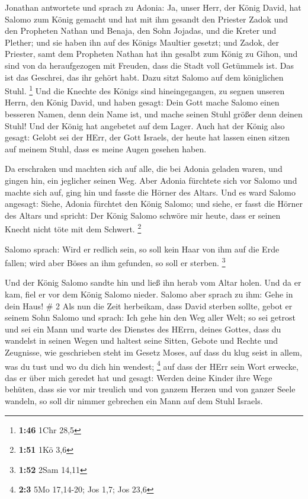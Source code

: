  Jonathan antwortete und sprach zu Adonia: Ja, unser Herr,
der König David, hat Salomo zum König gemacht  und hat mit
ihm gesandt den Priester Zadok und den Propheten Nathan und Benaja, den
Sohn Jojadas, und die Kreter und Plether; und sie haben ihn auf des
Königs Maultier gesetzt;  und Zadok, der Priester, samt dem
Propheten Nathan hat ihn gesalbt zum König zu Gihon, und sind von da
heraufgezogen mit Freuden, dass die Stadt voll Getümmels ist. Das ist
das Geschrei, das ihr gehört habt.  Dazu sitzt Salomo auf
dem königlichen Stuhl. \footnote{\textbf{1:46} 1Chr 28,5} 
Und die Knechte des Königs sind hineingegangen, zu segnen unseren Herrn,
den König David, und haben gesagt: Dein Gott mache Salomo einen besseren
Namen, denn dein Name ist, und mache seinen Stuhl größer denn deinen
Stuhl! Und der König hat angebetet auf dem Lager.  Auch hat
der König also gesagt: Gelobt sei der HErr, der Gott Israels, der heute
hat lassen einen sitzen auf meinem Stuhl, dass es meine Augen gesehen
haben.

 Da erschraken und machten sich auf alle, die bei Adonia
geladen waren, und gingen hin, ein jeglicher seinen Weg. 
Aber Adonia fürchtete sich vor Salomo und machte sich auf, ging hin und
fasste die Hörner des Altars.  Und es ward Salomo angesagt:
Siehe, Adonia fürchtet den König Salomo; und siehe, er fasst die Hörner
des Altars und spricht: Der König Salomo schwöre mir heute, dass er
seinen Knecht nicht töte mit dem Schwert. \footnote{\textbf{1:51} 1Kö
  3,6}

 Salomo sprach: Wird er redlich sein, so soll kein Haar von
ihm auf die Erde fallen; wird aber Böses an ihm gefunden, so soll er
sterben. \footnote{\textbf{1:52} 2Sam 14,11}

 Und der König Salomo sandte hin und ließ ihn herab vom
Altar holen. Und da er kam, fiel er vor dem König Salomo nieder. Salomo
aber sprach zu ihm: Gehe in dein Haus! \# 2  Als nun die
Zeit herbeikam, dass David sterben sollte, gebot er seinem Sohn Salomo
und sprach:  Ich gehe hin den Weg aller Welt; so sei getrost
und sei ein Mann  und warte des Dienstes des HErrn, deines
Gottes, dass du wandelst in seinen Wegen und haltest seine Sitten,
Gebote und Rechte und Zeugnisse, wie geschrieben steht im Gesetz Moses,
auf dass du klug seist in allem, was du tust und wo du dich hin wendest;
\footnote{\textbf{2:3} 5Mo 17,14-20; Jos 1,7; Jos 23,6}  auf
dass der HErr sein Wort erwecke, das er über mich geredet hat und
gesagt: Werden deine Kinder ihre Wege behüten, dass sie vor mir treulich
und von ganzem Herzen und von ganzer Seele wandeln, so soll dir nimmer
gebrechen ein Mann auf dem Stuhl Israels.

